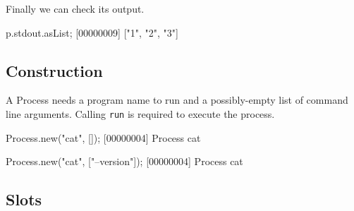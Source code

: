\noindent
Finally we can check its output.

\begin{urbiscript}
p.stdout.asList;
[00000009] ["1", "2", "3"]
\end{urbiscript}

\subsection{Construction}

A Process needs a program name to run and a possibly-empty list of
command line arguments.  Calling \lstinline|run| is required to
execute the process.

\begin{urbiscript}
Process.new("cat", []);
[00000004] Process cat

Process.new("cat", ["--version"]);
[00000004] Process cat
\end{urbiscript}

\subsection{Slots}

